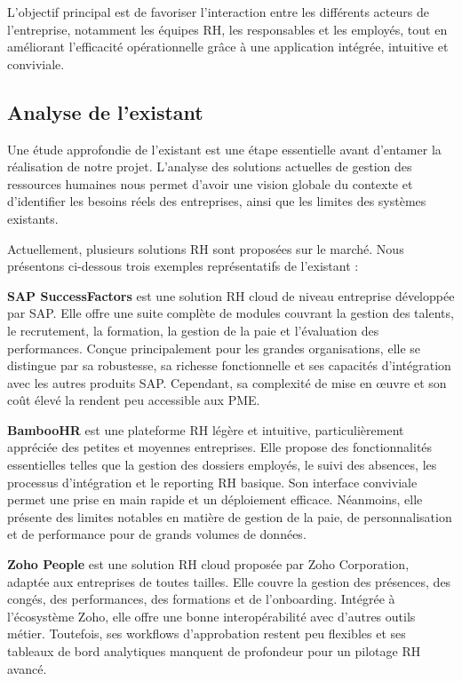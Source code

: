 L'objectif principal est de favoriser l'interaction entre les différents acteurs de l'entreprise, notamment les équipes RH, les responsables et les employés, tout en améliorant l'efficacité opérationnelle grâce à une application intégrée, intuitive et conviviale.

\subsection{Analyse de l'existant}

Une étude approfondie de l'existant est une étape essentielle avant d'entamer la réalisation de notre projet. L'analyse des solutions actuelles de gestion des ressources humaines nous permet d'avoir une vision globale du contexte et d'identifier les besoins réels des entreprises, ainsi que les limites des systèmes existants.

Actuellement, plusieurs solutions RH sont proposées sur le marché. Nous présentons ci-dessous trois exemples représentatifs de l'existant :

\textbf{SAP SuccessFactors} est une solution RH cloud de niveau entreprise développée par SAP. Elle offre une suite complète de modules couvrant la gestion des talents, le recrutement, la formation, la gestion de la paie et l'évaluation des performances. Conçue principalement pour les grandes organisations, elle se distingue par sa robustesse, sa richesse fonctionnelle et ses capacités d'intégration avec les autres produits SAP. Cependant, sa complexité de mise en œuvre et son coût élevé la rendent peu accessible aux PME.

\textbf{BambooHR} est une plateforme RH légère et intuitive, particulièrement appréciée des petites et moyennes entreprises. Elle propose des fonctionnalités essentielles telles que la gestion des dossiers employés, le suivi des absences, les processus d'intégration et le reporting RH basique. Son interface conviviale permet une prise en main rapide et un déploiement efficace. Néanmoins, elle présente des limites notables en matière de gestion de la paie, de personnalisation et de performance pour de grands volumes de données.

\textbf{Zoho People} est une solution RH cloud proposée par Zoho Corporation, adaptée aux entreprises de toutes tailles. Elle couvre la gestion des présences, des congés, des performances, des formations et de l'onboarding. Intégrée à l'écosystème Zoho, elle offre une bonne interopérabilité avec d'autres outils métier. Toutefois, ses workflows d'approbation restent peu flexibles et ses tableaux de bord analytiques manquent de profondeur pour un pilotage RH avancé.

